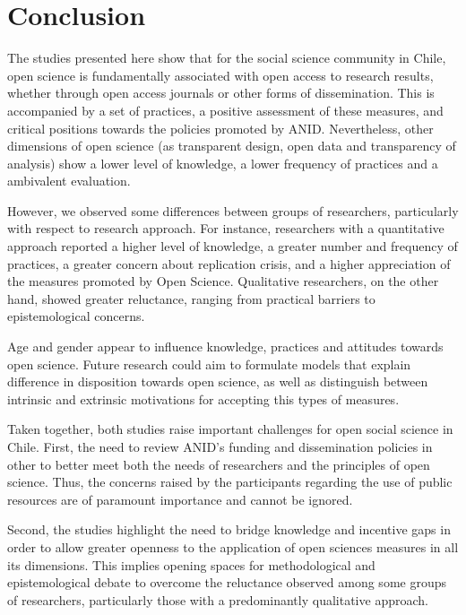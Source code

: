 \documentclass[
  letterpaper,
  DIV=11,
  numbers=noendperiod]{scrartcl}
\begin{document}
\hypertarget{conclusion}{%
\section{Conclusion}\label{conclusion}}

The studies presented here show that for the social science community in
Chile, open science is fundamentally associated with open access to
research results, whether through open access journals or other forms of
dissemination. This is accompanied by a set of practices, a positive
assessment of these measures, and critical positions towards the
policies promoted by ANID. Nevertheless, other dimensions of open
science (as transparent design, open data and transparency of analysis)
show a lower level of knowledge, a lower frequency of practices and a
ambivalent evaluation.

However, we observed some differences between groups of researchers,
particularly with respect to research approach. For instance,
researchers with a quantitative approach reported a higher level of
knowledge, a greater number and frequency of practices, a greater
concern about replication crisis, and a higher appreciation of the
measures promoted by Open Science. Qualitative researchers, on the other
hand, showed greater reluctance, ranging from practical barriers to
epistemological concerns.

Age and gender appear to influence knowledge, practices and attitudes
towards open science. Future research could aim to formulate models that
explain difference in disposition towards open science, as well as
distinguish between intrinsic and extrinsic motivations for accepting
this types of measures.

Taken together, both studies raise important challenges for open social
science in Chile. First, the need to review ANID's funding and
dissemination policies in other to better meet both the needs of
researchers and the principles of open science. Thus, the concerns
raised by the participants regarding the use of public resources are of
paramount importance and cannot be ignored.

Second, the studies highlight the need to bridge knowledge and incentive
gaps in order to allow greater openness to the application of open
sciences measures in all its dimensions. This implies opening spaces for
methodological and epistemological debate to overcome the reluctance
observed among some groups of researchers, particularly those with a
predominantly qualitative approach.
\end{document}

